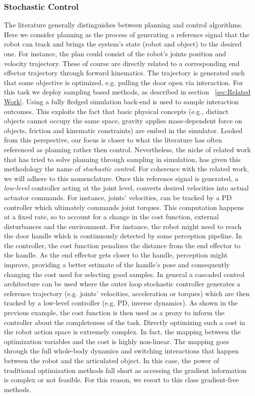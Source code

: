\subsubsection{Stochastic Control}\label{sec:pred_control}
The literature generally distinguishes between planning and control algorithms. Here we consider planning as the process of generating a reference signal that the robot can track and brings the system's state (robot and object) to the desired one. For instance, the plan could consist of the robot's joints position and velocity trajectory. These of course are directly related to a corresponding end effector trajectory through forward kinematics. The trajectory is generated such that some objective is optimized, e.g. pulling the door open via interaction. For this task we deploy sampling based methods, as described in section ~\ref{sec:Related Work}. Using a fully fledged simulation back-end is used to sample interaction outcomes. This exploits the fact that basic physical concepts (e.g., distinct objects cannot occupy the same space, gravity applies mass-dependent force on objects, friction and kinematic constraints) are embed in the simulator. Looked from this perspective, our focus is closer to what the literature has often referenced as planning rather then control. 
Nevertheless, the niche of related work that has tried to solve planning through sampling in simulation, has given this methodology the name of \emph{stochastic control}. For coherence with the related work, we will adhere to this nomenclature. Once this reference signal is generated, a \emph{low-level} controller acting at the joint level, converts desired velocities into actual actuator commands. For instance, joints' velocities, can be tracked by a PD controller which ultimately commands joint torques. This computation happens at a fixed rate, so to account for a change in the cost function, external disturbances and the environment. For instance, the robot might need to reach the door handle which is continuously detected by some perception pipeline. In the controller, the cost function penalizes the distance from the end effector to the handle. As the end effector gets closer to the handle, perception might improve, providing a better estimate of the handle's pose and consequently changing the cost used for selecting good samples. In general a cascaded control architecture can be used where the outer loop stochastic controller generates a reference trajectory (e.g. joints' velocities, acceleration or torques) which are then tracked by a low-level controller (e.g. PD, inverse dynamics).  
As shown in the previous example, the cost function is then used as a proxy to inform the controller about the completeness of the task. 
Directly optimizing such a cost in the robot action space is extremely complex. In fact, the mapping between the optimization variables and the cost is highly non-linear. The mapping goes through the full whole-body dynamics and switching interactions that happen between the robot and the articulated object. In this case, the power of traditional optimization methods fall short as accessing the gradient information is complex or not feasible. For this reason, we resort to this class gradient-free methods. 

